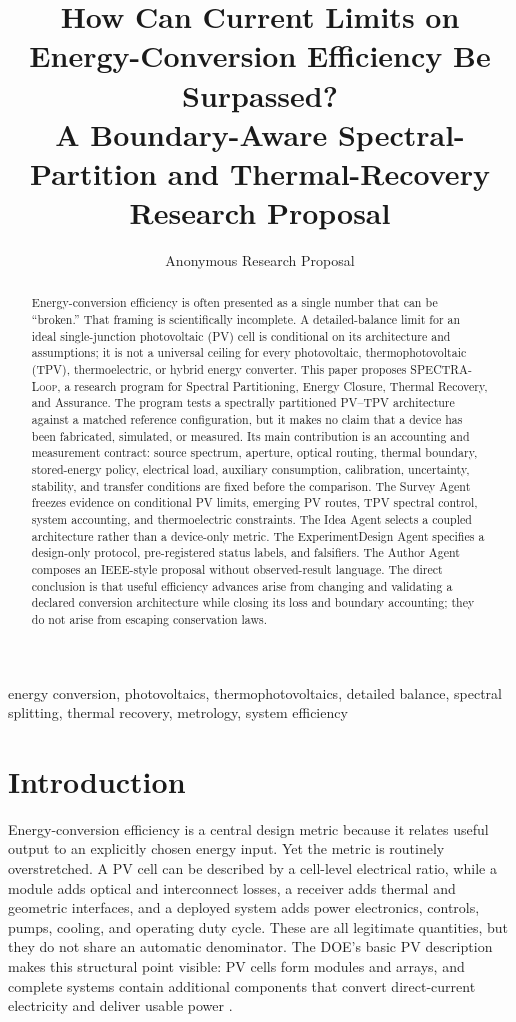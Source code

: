 \documentclass[conference]{../../../../Conference-LaTeX-template_10-17-19/IEEEtran}
\title{How Can Current Limits on Energy-Conversion Efficiency Be Surpassed?\\
\large A Boundary-Aware Spectral-Partition and Thermal-Recovery Research Proposal}
\author{Anonymous Research Proposal}
\newcommand{\spectraloop}{\textsc{SPECTRA-Loop}}
\begin{document}
\maketitle

\begin{abstract}
Energy-conversion efficiency is often presented as a single number that can be ``broken.'' That framing is scientifically incomplete. A detailed-balance limit for an ideal single-junction photovoltaic (PV) cell is conditional on its architecture and assumptions; it is not a universal ceiling for every photovoltaic, thermophotovoltaic (TPV), thermoelectric, or hybrid energy converter. This paper proposes \spectraloop{}, a research program for Spectral Partitioning, Energy Closure, Thermal Recovery, and Assurance. The program tests a spectrally partitioned PV--TPV architecture against a matched reference configuration, but it makes no claim that a device has been fabricated, simulated, or measured. Its main contribution is an accounting and measurement contract: source spectrum, aperture, optical routing, thermal boundary, stored-energy policy, electrical load, auxiliary consumption, calibration, uncertainty, stability, and transfer conditions are fixed before the comparison. The Survey Agent freezes evidence on conditional PV limits, emerging PV routes, TPV spectral control, system accounting, and thermoelectric constraints. The Idea Agent selects a coupled architecture rather than a device-only metric. The ExperimentDesign Agent specifies a design-only protocol, pre-registered status labels, and falsifiers. The Author Agent composes an IEEE-style proposal without observed-result language. The direct conclusion is that useful efficiency advances arise from changing and validating a declared conversion architecture while closing its loss and boundary accounting; they do not arise from escaping conservation laws.
\end{abstract}

\begin{IEEEkeywords}
energy conversion, photovoltaics, thermophotovoltaics, detailed balance, spectral splitting, thermal recovery, metrology, system efficiency
\end{IEEEkeywords}

\section{Introduction}
Energy-conversion efficiency is a central design metric because it relates useful output to an explicitly chosen energy input. Yet the metric is routinely overstretched. A PV cell can be described by a cell-level electrical ratio, while a module adds optical and interconnect losses, a receiver adds thermal and geometric interfaces, and a deployed system adds power electronics, controls, pumps, cooling, and operating duty cycle. These are all legitimate quantities, but they do not share an automatic denominator. The DOE's basic PV description makes this structural point visible: PV cells form modules and arrays, and complete systems contain additional components that convert direct-current electricity and deliver usable power \cite{doe_pv_basics_2026}.
\end{document}
